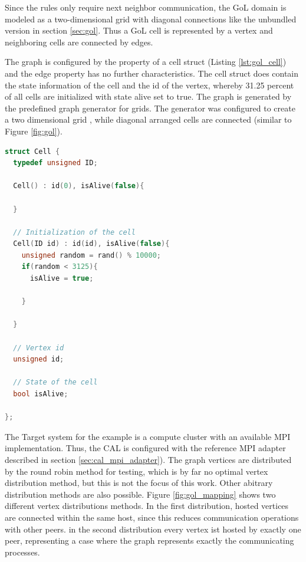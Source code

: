 Since the rules only require next neighbor communication, the GoL
domain is modeled as a two-dimensional grid with diagonal connections
like the unbundled version in section \ref{sec:gol}. Thus a GoL cell
is represented by a vertex and neighboring cells are connected by
edges.

The graph is configured by the property of a cell struct (Listing
\ref{lst:gol_cell}) and the edge property has no further
characteristics.  The cell struct does contain the state information
of the cell and the id of the vertex, whereby 31.25 percent of all
cells are initialized with state alive set to true.  The graph is
generated by the predefined graph generator for grids. The generator
was configured to create a two dimensional grid , while diagonal
arranged cells are connected (similar to Figure \ref{fig:gol}).

\begin{lstlisting}[language=C++, label=lst:gol_cell]
struct Cell { 
  typedef unsigned ID; 

  Cell() : id(0), isAlive(false){ 
  
  }
  
  // Initialization of the cell
  Cell(ID id) : id(id), isAlive(false){ 
    unsigned random = rand() % 10000;
    if(random < 3125){ 
      isAlive = true;

    }

  }
   
  // Vertex id
  unsigned id;

  // State of the cell
  bool isAlive;

};
\end{lstlisting}


The Target system for the example is a compute cluster with an
available MPI implementation. Thus, the CAL is configured with the
reference MPI adapter described in section
\ref{sec:cal_mpi_adapter}). The graph vertices are distributed by the
round robin method for testing, which is by far no optimal vertex
distribution method, but this is not the focus of this work.  Other
abitrary distribution methods are also possible. Figure
\ref{fig:gol_mapping} shows two different vertex distributions
methods.  In the first distribution, hosted vertices are connected
within the same host, since this reduces communication operations with
other peers.  in the second distribution every vertex ist hosted by
exactly one peer, representing a case where the graph represents
exactly the communicating processes.


